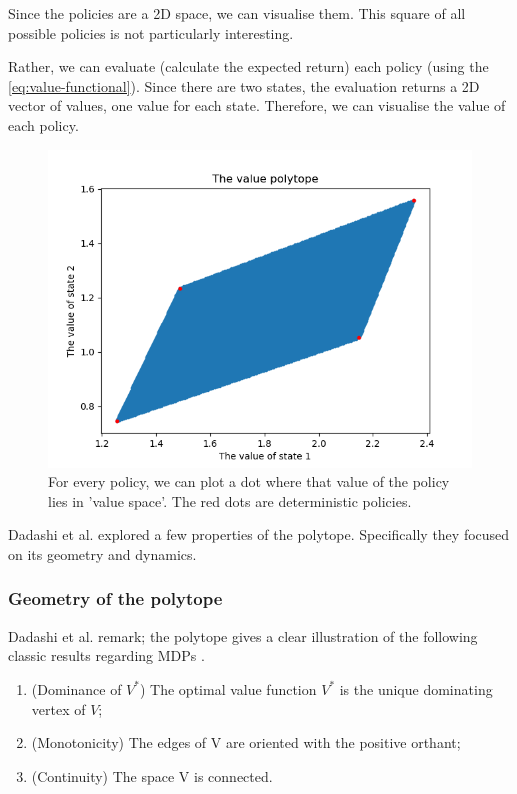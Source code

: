 Since the policies are a 2D space, we can visualise them. This square of all possible policies is not particularly interesting.

Rather, we can evaluate (calculate the expected return) each policy (using the \eqref{eq:value-functional}).
Since there are two states, the evaluation returns a 2D vector of values, one value for each state.
Therefore, we can visualise the value of each policy.
\begin{figure}[!hb]
\centering
\includegraphics[width=1\textwidth,height=0.5\textheight]{../../pictures/figures/value-polytope.png}
\caption{For every policy, we can plot a dot where that value of the policy lies in 'value space'.
The red dots are deterministic policies.}
\end{figure}

Dadashi et al. \cite{Dadashi2018} explored a few properties of the polytope.
Specifically they focused on its geometry and dynamics.

\subsubsection{Geometry of the polytope}

Dadashi et al. remark; the polytope gives a clear illustration of the following classic results regarding MDPs \cite{Bertsekas1996}.

\begin{enumerate}
\tightlist
  \item (Dominance of $V^*$) The optimal value function $V^*$ is the unique dominating vertex of $V$;
  \item (Monotonicity) The edges of V are oriented with the positive orthant;
  \item (Continuity) The space V is connected.
\end{enumerate}

